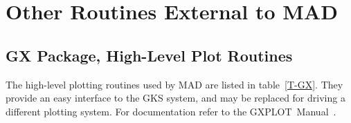
\chapter{Other Routines External to MAD}

\section{GX Package, High-Level Plot Routines}

The high-level plotting routines used by MAD are listed in
table~\ref{T-GX}.
They provide an easy interface to the GKS system,
and may be replaced for driving a different plotting system.
For documentation refer to the GXPLOT~Manual~\cite{GXPLOT}.

